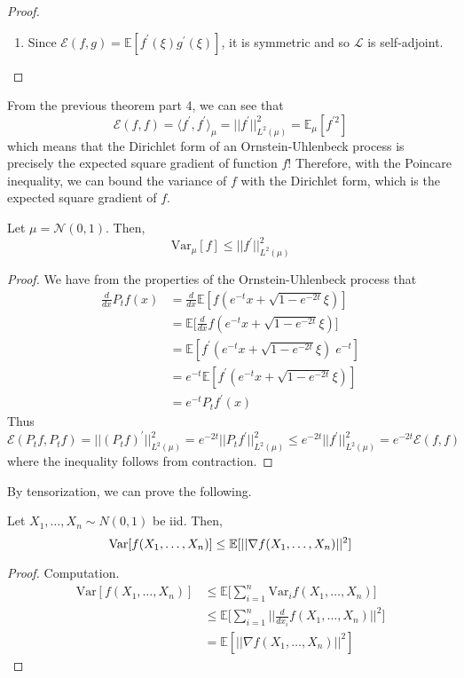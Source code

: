 \begin{proof}
\begin{enumerate}
      \item Since $\mathcal{E}(f, g) = \mathbb{E}[f^\prime(\xi) g^\prime (\xi)]$, it is symmetric and so $\mathscr{L}$ is self-adjoint. 
  \end{enumerate}

  \end{proof}

  From the previous theorem part 4, we can see that 
  \[\mathcal{E}(f, f) = \langle f^\prime, f^\prime \rangle_\mu = ||f^\prime||_{L^2(\mu)}^2 = \mathbb{E}_\mu[ f^{\prime 2} ]\]
  which means that the Dirichlet form of an Ornstein-Uhlenbeck process is precisely the expected square gradient of function $f$! Therefore, with the Poincare inequality, we can bound the variance of $f$ with the Dirichlet form, which is the expected square gradient of $f$. 

  \begin{theorem}
  Let $\mu = \mathcal{N}(0, 1)$. Then, 
  \[\mathrm{Var}_\mu [f] \leq ||f^\prime||_{L^2(\mu)}^2\]
  \end{theorem}
  \begin{proof}
  We have from the properties of the Ornstein-Uhlenbeck process that
  \begin{align*}
      \frac{d}{dx} P_t f(x) & = \frac{d}{dx} \mathbb{E}[ f(e^{-t} x + \sqrt{1 - e^{-2t}} \xi)] \\
      & = \mathbb{E} \bigg[ \frac{d}{dx} f(e^{-t} x + \sqrt{1 - e^{-2t}} \xi)] \\
      & = \mathbb{E}[f^\prime (e^{-t} x + \sqrt{1 - e^{-2t}} \xi) \; e^{-t}] \\
      & = e^{-t} \mathbb{E}[f^\prime (e^{-t} x + \sqrt{1 - e^{-2t}} \xi)] \\
      & = e^{-t} P_t f^\prime (x) 
  \end{align*}
  Thus
  \[\mathcal{E}(P_t f, P_t f) = ||(P_t f)^\prime||_{L^2 (\mu)}^2 = e^{-2t} || P_t f^\prime ||^2_{L^2(\mu)} \leq e^{-2t} ||f^\prime||^2_{L^2(\mu)} = e^{-2t} \mathcal{E}(f, f) \]
  where the inequality follows from contraction. 
  \end{proof}

  By tensorization, we can prove the following. 

  \begin{corollary}
  Let $X_1, \ldots, X_n \sim N(0, 1)$ be iid. Then, 
  \[\operatorname{Var}[ f(X_1, \ldots, X_n)] \leq \mathbb{E}[ || \nabla f (X_1, \ldots, X_n)||^2 ]\]
  \end{corollary}
  \begin{proof}
  Computation. 
  \begin{align*}
      \mathrm{Var}[f(X_1, \ldots, X_n)] & \leq \mathbb{E} \bigg[ \sum_{i=1}^n \mathrm{Var}_i f(X_1, \ldots, X_n) \bigg] \\
      & \leq \mathbb{E} \bigg[ \sum_{i=1}^n \bigg| \bigg| \frac{d}{dx_i} f(X_1, \ldots, X_n)\bigg|\bigg|^2 \bigg] \\
      & = \mathbb{E}[ ||\nabla f (X_1, \ldots, X_n) ||^2 ]
  \end{align*}
  \end{proof}

